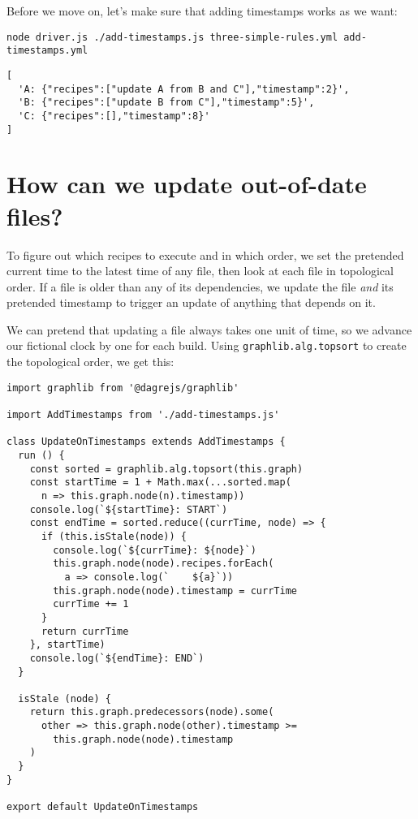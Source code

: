 \documentclass[krantzl]{krantz}
\begin{document}
Before we move on,
let's make sure that adding timestamps works as we want:


\begin{lstlisting}[frame=single,frameround=tttt]
node driver.js ./add-timestamps.js three-simple-rules.yml add-timestamps.yml
\end{lstlisting}



\begin{lstlisting}[frame=single,frameround=tttt]
[
  'A: {"recipes":["update A from B and C"],"timestamp":2}',
  'B: {"recipes":["update B from C"],"timestamp":5}',
  'C: {"recipes":[],"timestamp":8}'
]
\end{lstlisting}


\section{How can we update out-of-date files?}\label{build-manager-update}


To figure out which recipes to execute and in which order,
we set the pretended current time to the latest time of any file,
then look at each file in topological order.
If a file is older than any of its dependencies,
we update the file \emph{and} its pretended timestamp
to trigger an update of anything that depends on it.


We can pretend that updating a file always takes one unit of time,
so we advance our fictional clock by one for each build.
Using \texttt{graphlib.alg.topsort} to create the topological order,
we get this:


\begin{lstlisting}[frame=single,frameround=tttt]
import graphlib from '@dagrejs/graphlib'

import AddTimestamps from './add-timestamps.js'

class UpdateOnTimestamps extends AddTimestamps {
  run () {
    const sorted = graphlib.alg.topsort(this.graph)
    const startTime = 1 + Math.max(...sorted.map(
      n => this.graph.node(n).timestamp))
    console.log(`${startTime}: START`)
    const endTime = sorted.reduce((currTime, node) => {
      if (this.isStale(node)) {
        console.log(`${currTime}: ${node}`)
        this.graph.node(node).recipes.forEach(
          a => console.log(`    ${a}`))
        this.graph.node(node).timestamp = currTime
        currTime += 1
      }
      return currTime
    }, startTime)
    console.log(`${endTime}: END`)
  }

  isStale (node) {
    return this.graph.predecessors(node).some(
      other => this.graph.node(other).timestamp >=
        this.graph.node(node).timestamp
    )
  }
}

export default UpdateOnTimestamps
\end{lstlisting}
\end{document}
